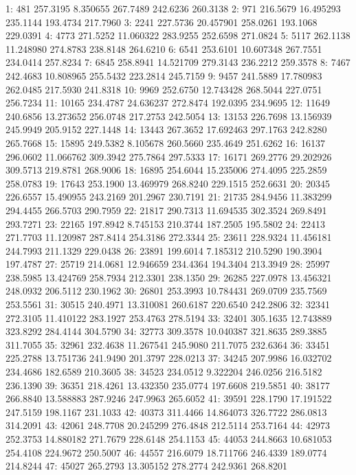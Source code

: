 \documentclass[
  10pt,
  a4paper,oneside]{article}
\begin{document}
1: 481 257.3195 8.350655 267.7489 242.6236 260.3138
2: 971 216.5679 16.495293 235.1144 193.4734 217.7960
3: 2241 227.5736 20.457901 258.0261 193.1068 229.0391
4: 4773 271.5252 11.060322 283.9255 252.6598 271.0824
5: 5117 262.1138 11.248980 274.8783 238.8148 264.6210
6: 6541 253.6101 10.607348 267.7551 234.0414 257.8234
7: 6845 258.8941 14.521709 279.3143 236.2212 259.3578
8: 7467 242.4683 10.808965 255.5432 223.2814 245.7159
9: 9457 241.5889 17.780983 262.0485 217.5930 241.8318
10: 9969 252.6750 12.743428 268.5044 227.0751 256.7234
11: 10165 234.4787 24.636237 272.8474 192.0395 234.9695
12: 11649 240.6856 13.273652 256.0748 217.2753 242.5054
13: 13153 226.7698 13.156939 245.9949 205.9152 227.1448
14: 13443 267.3652 17.692463 297.1763 242.8280 265.7668
15: 15895 249.5382 8.105678 260.5660 235.4649 251.6262
16: 16137 296.0602 11.066762 309.3942 275.7864 297.5333
17: 16171 269.2776 29.202926 309.5713 219.8781 268.9006
18: 16895 254.6044 15.235006 274.4095 225.2859 258.0783
19: 17643 253.1900 13.469979 268.8240 229.1515 252.6631
20: 20345 226.6557 15.490955 243.2169 201.2967 230.7191
21: 21735 284.9456 11.383299 294.4455 266.5703 290.7959
22: 21817 290.7313 11.694535 302.3524 269.8491 293.7271
23: 22165 197.8942 8.745153 210.3744 187.2505 195.5802
24: 22413 271.7703 11.120987 287.8414 254.3186 272.3344
25: 23611 228.9324 11.456181 244.7993 211.1329 229.0438
26: 23891 199.6014 7.185312 210.5290 190.3904 197.4787
27: 25719 214.0681 12.946659 234.4364 194.3404 213.3949
28: 25997 238.5985 13.424769 258.7934 212.3301 238.1350
29: 26285 227.0978 13.456321 248.0932 206.5112 230.1962
30: 26801 253.3993 10.784431 269.0709 235.7569 253.5561
31: 30515 240.4971 13.310081 260.6187 220.6540 242.2806
32: 32341 272.3105 11.410122 283.1927 253.4763 278.5194
33: 32401 305.1635 12.743889 323.8292 284.4144 304.5790
34: 32773 309.3578 10.040387 321.8635 289.3885 311.7055
35: 32961 232.4638 11.267541 245.9080 211.7075 232.6364
36: 33451 225.2788 13.751736 241.9490 201.3797 228.0213
37: 34245 207.9986 16.032702 234.4686 182.6589 210.3605
38: 34523 234.0512 9.322204 246.0256 216.5182 236.1390
39: 36351 218.4261 13.432350 235.0774 197.6608 219.5851
40: 38177 266.8840 13.588883 287.9246 247.9963 265.6052
41: 39591 228.1790 17.191522 247.5159 198.1167 231.1033
42: 40373 311.4466 14.864073 326.7722 286.0813 314.2091
43: 42061 248.7708 20.245299 276.4848 212.5114 253.7164
44: 42973 252.3753 14.880182 271.7679 228.6148 254.1153
45: 44053 244.8663 10.681053 254.4108 224.9672 250.5007
46: 44557 216.6079 18.711766 246.4339 189.0774 214.8244
47: 45027 265.2793 13.305152 278.2774 242.9361 268.8201
\end{document}
